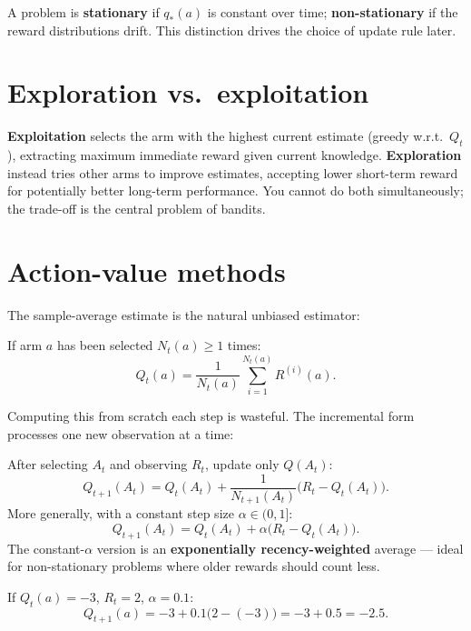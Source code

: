 \documentclass[11pt, oneside]{book}
\newcommand{\qtrue}{q_{*}}            %
\begin{document}
A problem is \textbf{stationary} if $\qtrue(a)$ is constant over time;
\textbf{non-stationary} if the reward distributions drift. This distinction
drives the choice of update rule later.

\section{Exploration vs.\ exploitation}

\textbf{Exploitation} selects the arm with the highest current estimate
(greedy w.r.t.\ $Q_t$), extracting maximum immediate reward given current
knowledge. \textbf{Exploration} instead tries other arms to improve estimates,
accepting lower short-term reward for potentially better long-term performance.
You cannot do both simultaneously; the trade-off is the central problem of bandits.

\section{Action-value methods}

The sample-average estimate is the natural unbiased estimator:

\begin{thmbox}[title={Sample-Average Estimate}]
If arm $a$ has been selected $N_t(a) \ge 1$ times:
\[
  Q_t(a) = \frac{1}{N_t(a)}\sum_{i=1}^{N_t(a)} R^{(i)}(a).
\]
\end{thmbox}

Computing this from scratch each step is wasteful. The incremental form
processes one new observation at a time:

\begin{thmbox}[title={Incremental Update (ISAM)}]
After selecting $A_t$ and observing $R_t$, update only $Q(A_t)$:
\[
  Q_{t+1}(A_t) = Q_t(A_t) + \frac{1}{N_{t+1}(A_t)}\bigl(R_t - Q_t(A_t)\bigr).
\]
More generally, with a constant step size $\alpha \in (0,1]$:
\[
  Q_{t+1}(A_t) = Q_t(A_t) + \alpha\bigl(R_t - Q_t(A_t)\bigr).
\]
The constant-$\alpha$ version is an \textbf{exponentially recency-weighted}
average --- ideal for non-stationary problems where older rewards should count
less.
\end{thmbox}

\begin{exbox}[title={Incremental Update Calculation}]
If $Q_t(a) = -3$, $R_t = 2$, $\alpha = 0.1$:
\[
  Q_{t+1}(a) = -3 + 0.1\bigl(2 - (-3)\bigr) = -3 + 0.5 = -2.5.
\]
\end{exbox}
\end{document}
